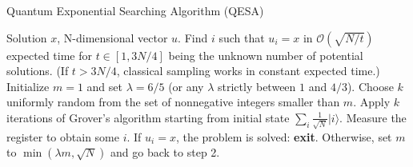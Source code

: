 \documentclass{article}
\begin{document}
\pagestyle{empty} 

\begin{algorithm}[ht]
	\caption{Quantum Exponential Searching Algorithm (QESA)}
	\label{QESA}
	\begin{algorithmic}[1]

		\Require  Solution $x$, N-dimensional vector $u$.
		\Ensure Find $i$ such that $u_i = x$ in $\mathcal{O}(\sqrt{N/t})$ expected time for $t \in [1,3N/4]$ being the unknown number of potential solutions. (If $t>3N/4$, classical sampling works in constant expected time.)
		\vspace{10pt}
		\State Initialize $m=1$ and set $\lambda = 6/5$ (or any $\lambda$ strictly between $1$ and $4/3$).
		\State Choose $k$ uniformly random from the set of nonnegative integers smaller than $m$.
		\State Apply $k$ iterations of Grover's algorithm starting from initial state $\sum_i \frac{1}{\sqrt{N}} |i\rangle$.
		\State Measure the register to obtain some $i$.
		\State If $u_i = x$, the problem is solved: \textbf{exit}.
		\State Otherwise, set $m$ to $\min(\lambda m, \sqrt{N})$ and go back to step 2.
	\end{algorithmic}
\end{algorithm}
\end{document}
